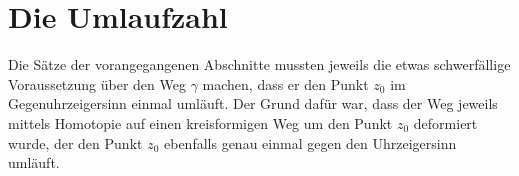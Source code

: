 %
%
%
\section{Die Umlaufzahl
\label{buch:integration:cauchy:subsetion:umlaufzahl}}
%
Die Sätze der vorangegangenen Abschnitte mussten jeweils die etwas
schwerfällige Voraussetzung über den Weg $\gamma$ machen, dass er
den Punkt $z_0$ im Gegenuhrzeigersinn einmal umläuft.
Der Grund dafür war, dass der Weg jeweils mittels Homotopie auf einen
kreisformigen Weg um den Punkt $z_0$ deformiert wurde, der den Punkt $z_0$
ebenfalls genau einmal gegen den Uhrzeigersinn umläuft.





